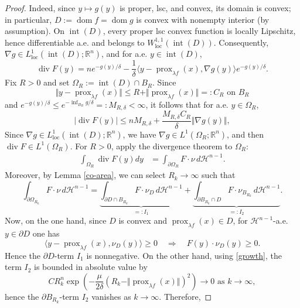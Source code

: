\documentclass[10pt,a4paper]{amsart}
\begin{document}
\begin{proof}
Indeed, since $y\mapsto g(y)$ is proper, lsc, and convex, its domain is convex; in particular, $D:=\operatorname{dom}f=\operatorname{dom}g$ is convex with nonempty interior (by assumption). On $\operatorname{int}(D)$, every proper lsc convex function is locally Lipschitz, hence differentiable a.e. and belongs to $W^{1,1}_{\operatorname{loc}}(\operatorname{int}(D))$. Consequently, $\nabla g\in L^1_{\operatorname{loc}}(\operatorname{int}(D);\mathbb{R}^n)$, and for a.e. $y \in \operatorname{int}(D)$,
$$
\operatorname{div}F(y)=ne^{-g(y)/\delta}-\frac{1}{\delta}\langle y-\operatorname{prox}_{\lambda f}(x),\nabla g(y)\rangle e^{-g(y)/\delta}.
$$
Fix $R>0$ and set $\Omega_R:=\operatorname{int}(D) \cap B_R $. Since 
$$\Vert y-\operatorname{prox}_{\lambda f}(x)\Vert \leq R+\Vert \operatorname{prox}_{\lambda f}(x)\Vert =:C_R \textrm{ on } B_R
$$
and $e^{-g(y)/\delta}\leq e^{-\inf_{B_R}g/\delta}=:M_{R,\delta}<\infty$, it follows that for a.e. $y\in \Omega_{R}$,
$$
\vert \operatorname{div}F(y)\vert \leq nM_{R,\delta}+\frac{M_{R,\delta}C_{R}}{\delta}\Vert \nabla g(y)\Vert,
$$
Since $\nabla g\in L^1_{\operatorname{loc}}(\operatorname{int}(D);\mathbb{R}^n)$, we have $\nabla g\in L^1(\Omega_R;\mathbb{R}^n)$, and then $\operatorname{div}F\in L^1(\Omega_R)$. For $R>0$, apply the divergence theorem to $\Omega_R$:
\begin{equation*}
    \begin{aligned}
\int_{\Omega_R}\operatorname{div}F(y)dy&=\int_{\partial \Omega_R} F\cdot \nu\, d\mathcal{H}^{n-1}.
    \end{aligned}
\end{equation*}
Moreover, by Lemma \ref{co-area}, we can select $R_k\to \infty$ such that
\[
\int_{\partial \Omega_{R_k}} F \cdot \nu \, d\mathcal{H}^{n-1}
=
\underbrace{\int_{\partial D\cap {B}_{R_k}}
 F \cdot \nu_{D} \, d\mathcal{H}^{n-1}}_{=:I_1}+\underbrace{\int_{\partial {B}_{R_k}\cap D}
 F\cdot \nu_{{B}_{R_k}} \, d\mathcal{H}^{n-1}}_{=:I_2}.
\]
Now, on the one hand, since $D$ is convex and $\operatorname{prox}_{\lambda f}(x)\in D$, for $\mathcal{H}^{n-1}$-a.e. $y\in \partial D$ one has
$$
\langle y-\operatorname{prox}_{\lambda f}(x),\nu_D(y)\rangle \geq 0 \quad \Rightarrow \quad   F(y)\cdot \nu_D(y) \geq 0.
$$
Hence the $\partial D$-term  $I_1$ is nonnegative.  On the other hand, using \eqref{growth}, the term $I_2$  is bounded in absolute value by 
$$
CR_k^n \exp\left(-\frac{\mu}{2\delta}(R_k-\Vert \operatorname{prox}_{\lambda f}(x) \Vert)^2\right)\to 0 \textrm{ as } k\to \infty,
$$
hence the $\partial {B}_{R_k}$-term $I_2$ vanishes as $k\to \infty$. Therefore,

\end{proof}
\end{document}
